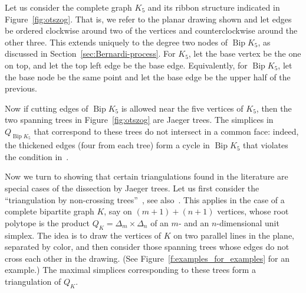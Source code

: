 \documentclass[ALCO,ThmDefs,Unicode,epreuves]{cedram}
\DeclareMathOperator{\bip}{Bip}
\begin{document}
\begin{exam}
\label{ex:otszog}
Let us consider the complete graph $K_5$ and its ribbon structure indicated in Figure~\ref{fig:otszog}. That is, we refer to the planar drawing shown and let edges be ordered clockwise around two of the vertices and counterclockwise around the other three. This extends uniquely to the degree two nodes of $\bip K_5$, as discussed in Section~\ref{sec:Bernardi-process}. For $K_5$, let the base vertex be the one on top, and let the top left edge be the base edge. Equivalently, for $\bip K_5$, let the base node be the same point and let the base edge be the upper half of the previous.

Now if cutting edges of $\bip K_5$ is allowed near the five vertices of $K_5$, then the two spanning trees in Figure~\ref{fig:otszog} are Jaeger trees. The simplices in $Q_{\bip K_5}$ that correspond to these trees do not intersect in a common face: indeed, the thickened edges (four from each tree) form a cycle in $\bip K_5$ that violates the condition in~\cite[Lemma~12.6]{alex}.
\end{exam}

Now we turn to showing that certain triangulations found in the literature are special cases of the dissection by Jaeger trees. Let us first consider the ``triangulation by non-crossing trees''~\cite{GGP}, see also~\cite[Example~5.3]{KP_Ehrhart}. This applies in the case of a complete bipartite graph $K$, say on $(m+1)+(n+1)$ vertices, whose root polytope is the product $Q_K=\Delta_m\times\Delta_n$ of an $m$- and an $n$-dimensional unit simplex. The idea is to draw the vertices of $K$ on two parallel lines in the plane, separated by color, and then consider those spanning trees whose edges do not cross each other in the drawing. (See Figure~\ref{f:examples_for_examples} for an example.) The maximal simplices corresponding to these trees form a triangulation of $Q_K$.
\end{document}

